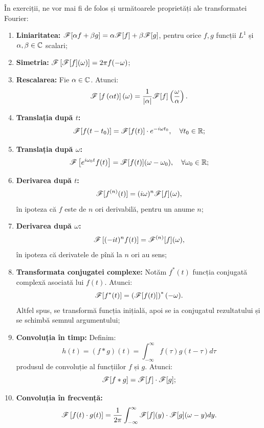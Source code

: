 În exerciții, ne vor mai fi de folos și următoarele proprietăți ale
transformatei Fourier:
\begin{enumerate}[(1)]
\item \textbf{Liniaritatea:} $ \mathscr{F}[\alpha f + \beta g] = \alpha \mathscr{F}[f] + \beta \mathscr{F}[g] $,
  pentru orice $ f, g $ funcții $ L^1 $ și $ \alpha, \beta \in \mathbb{C} $ scalari;
\item \textbf{Simetria:} $ \mathscr{F}\left[\mathscr{F}[f](\omega)\right] = 2\pi f(-\omega) $;
\item \textbf{Rescalarea:} Fie $ \alpha \in \mathbb{C} $. Atunci:
  \[
    \kal{F}\left[f\left(\alpha t\right)\right](\omega) = %
    \dfrac{1}{|\alpha|}\kal{F}[f]\left(\dfrac{\omega}{\alpha}\right).
  \]
\item \textbf{Translația după $ t $:}
  \[
    \kal{F}[f(t - t_0)] = \kal{F}[f(t)] \cdot e^{-i\omega t_0}, %
    \quad \forall t_0 \in \RR;
  \]
\item \textbf{Translația după $ \omega $:}
  \[
    \kal{F}\left[e^{i\omega_0 t}f(t)\right] = \kal{F}[f(t)](\omega - \omega_0), %
    \quad \forall \omega_0 \in \RR;
  \]
\item \textbf{Derivarea după $ t $:}
  \[
    \mathscr{F}[f^{(n)}(t)] = (i\omega)^n \mathscr{F}[f](\omega),
  \]
  în ipoteza că $ f $ este de $ n $ ori derivabilă, pentru un anume $ n $;
\item \textbf{Derivarea după $ \omega $:}
  \[
    \mathscr{F}\left[(-it)^n f(t)\right] = \mathscr{F}^{(n)}[f](\omega),
  \]
  în ipoteza că derivatele de pînă la $ n $ ori au sens;
\item \textbf{Transformata conjugatei complexe:} Notăm $ f^\ast(t) $ funcția
  conjugată complexă asociată lui $ f(t) $. Atunci:
  \[
    \mathscr{F}[f^\ast(t)] = \left(\mathscr{F}[f(t)]\right)^\ast(-\omega).
  \]
  Altfel spus, se transformă funcția inițială, apoi se ia conjugatul
  rezultatului și se schimbă semnul argumentului;
\item \textbf{Convoluția în timp:} Definim:
  \[
    h(t) = (f \ast g)(t) = \int_{-\infty}^\infty f(\tau)g(t - \tau)d\tau
  \]
  produsul de convoluție al funcțiilor $ f $ și $ g $.
  Atunci:
  \[
    \mathscr{F}[f \ast g] = \mathscr{F}[f] \cdot \mathscr{F}[g];
  \]
\item \textbf{Convoluția în frecvență:}
  \[
    \kal{F}\left[f(t) \cdot g(t)\right] = %
    \dfrac{1}{2 \pi} \int_{-\infty}^\infty \kal{F}[f](y) \cdot \kal{F}[g](\omega - y)dy.
  \]
\end{enumerate}

